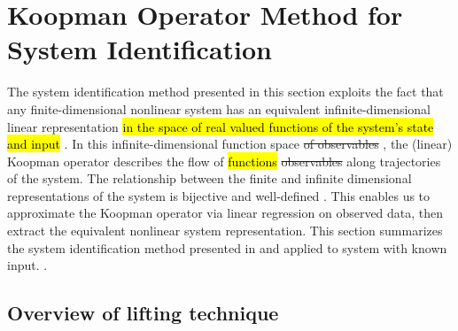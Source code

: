 \section{Koopman Operator Method for \\ System Identification}
\label{sec:theory}

The system identification method presented in this section exploits the fact that any finite-dimensional nonlinear system has an equivalent infinite-dimensional linear representation \hl{in the space of real valued functions of the system's state and input} .
In this infinite-dimensional function space \sout{of observables} , the (linear) Koopman operator describes the flow of \hl{functions} \sout{observables} along trajectories of the system.
The relationship between the finite and infinite dimensional representations of the system is bijective and well-defined \cite{lasota2013chaos} .
This enables us to approximate the Koopman operator via linear regression on observed data, then extract the equivalent nonlinear system representation.
This section summarizes the system identification method presented in \cite{mauroy2016linear} and \cite{mauroy2017koopman} applied to system with known input. .


\subsection{Overview of lifting technique}

